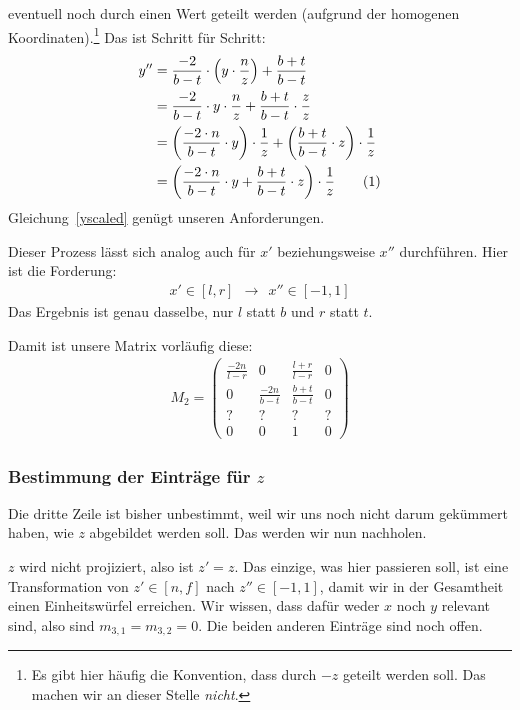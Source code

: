 \documentclass[a4paper,parskip=full*]{scrartcl}
\newcommand\numberthis{\addtocounter{equation}{1}\tag{\theequation}}
\begin{document}
eventuell noch durch einen Wert geteilt werden (aufgrund der homogenen
Koordinaten).\footnote{Es gibt hier häufig die Konvention, dass durch
	$-z$ geteilt werden soll. Das machen wir an dieser Stelle
\emph{nicht}.} Das ist Schritt für Schritt:
\begin{align*}
	y'' &= \frac{-2}{b - t} \cdot \left( y \cdot \frac{n}{z} \right) + \frac{b + t}{b - t}  \\
	    &= \frac{-2}{b - t} \cdot y \cdot \frac{n}{z} + \frac{b + t}{b - t} \cdot \frac{z}{z}  \\
	    &= \left( \frac{-2 \cdot n}{b - t} \cdot y \right) \cdot \frac{1}{z} + \left( \frac{b + t}{b - t} \cdot z \right) \cdot \frac{1}{z}  \\
	    &= \left( \frac{-2 \cdot n}{b - t} \cdot y + \frac{b + t}{b - t} \cdot z \right) \cdot \frac{1}{z}  \numberthis\label{yscaled}
\end{align*}
Gleichung~\eqref{yscaled} genügt unseren Anforderungen.

Dieser Prozess lässt sich analog auch für $x'$ beziehungsweise $x''$
durchführen. Hier ist die Forderung:
\begin{align*}
	x' \in [l, r]  ~~  \rightarrow  ~~  x'' \in [-1, 1]
\end{align*}
Das Ergebnis ist genau dasselbe, nur $l$ statt $b$ und $r$ statt $t$.

Damit ist unsere Matrix vorläufig diese:
\begin{align*}
	M_2 =
	\begin{pmatrix}
		\frac{-2n}{l - r} & 0 & \frac{l + r}{l - r} & 0  \\
		0 & \frac{-2n}{b - t} & \frac{b + t}{b - t} & 0  \\
		? & ? & ? & ?  \\
		0 & 0 & 1 & 0
	\end{pmatrix}
\end{align*}

\subsubsection{Bestimmung der Einträge für $z$}
Die dritte Zeile ist bisher unbestimmt, weil wir uns noch nicht darum
gekümmert haben, wie $z$ abgebildet werden soll. Das werden wir nun
nachholen.

$z$ wird nicht projiziert, also ist $z' = z$. Das einzige, was hier
passieren soll, ist eine Transformation von $z' \in [n, f]$ nach $z''
\in [-1, 1]$, damit wir in der Gesamtheit einen Einheitswürfel
erreichen. Wir wissen, dass dafür weder $x$ noch $y$ relevant sind,
also sind $m_{3,1} = m_{3,2} = 0$. Die beiden anderen Einträge sind noch
offen.
\end{document}
